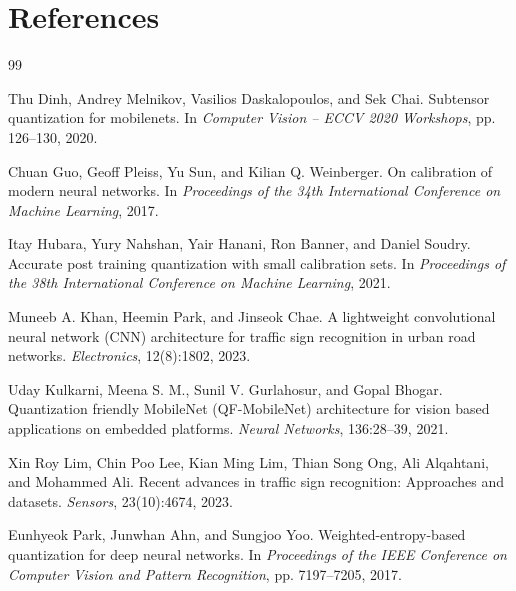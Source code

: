 \documentclass{article} %
\begin{document}
\renewcommand{\refname}{}
\section{References}
\vspace{-0.6em}
\small
\begin{thebibliography}{99}

Thu Dinh, Andrey Melnikov, Vasilios Daskalopoulos, and Sek Chai.
\newblock Subtensor quantization for mobilenets.
\newblock In \emph{Computer Vision -- ECCV 2020 Workshops}, pp. 126--130, 2020.

Chuan Guo, Geoff Pleiss, Yu Sun, and Kilian Q. Weinberger.
\newblock On calibration of modern neural networks.
\newblock In \emph{Proceedings of the 34th International Conference on Machine Learning}, 2017.

Itay Hubara, Yury Nahshan, Yair Hanani, Ron Banner, and Daniel Soudry.
\newblock Accurate post training quantization with small calibration sets.
\newblock In \emph{Proceedings of the 38th International Conference on Machine Learning}, 2021.

Muneeb A. Khan, Heemin Park, and Jinseok Chae.
\newblock A lightweight convolutional neural network (CNN) architecture for traffic sign recognition in urban road networks.
\newblock \emph{Electronics}, 12(8):1802, 2023.

Uday Kulkarni, Meena S. M., Sunil V. Gurlahosur, and Gopal Bhogar.
\newblock Quantization friendly MobileNet (QF-MobileNet) architecture for vision based applications on embedded platforms.
\newblock \emph{Neural Networks}, 136:28--39, 2021.

Xin Roy Lim, Chin Poo Lee, Kian Ming Lim, Thian Song Ong, Ali Alqahtani, and Mohammed Ali.
\newblock Recent advances in traffic sign recognition: Approaches and datasets.
\newblock \emph{Sensors}, 23(10):4674, 2023.

Eunhyeok Park, Junwhan Ahn, and Sungjoo Yoo.
\newblock Weighted-entropy-based quantization for deep neural networks.
\newblock In \emph{Proceedings of the IEEE Conference on Computer Vision and Pattern Recognition}, pp. 7197--7205, 2017.


\end{thebibliography}
\end{document}
